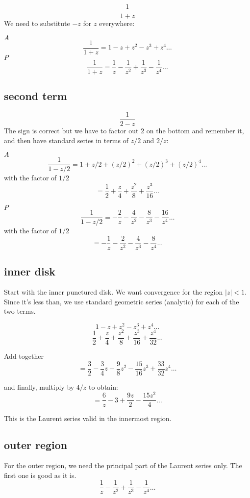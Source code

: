 \documentclass[11pt, oneside]{article}
\begin{document}
\[ \frac{1}{1 + z} \]
We need to substitute $-z$ for $z$ everywhere:

$A$
\[ \frac{1}{1 + z} = 1 - z + z^2 - z^3 + z^4 \dots \]
$P$ 
\[ \frac{1}{1 + z} = \frac{1}{z} - \frac{1}{z^2} + \frac{1}{z^3}  - \frac{1}{z^4} \dots \]

\subsection*{second term}

\[ \frac{1}{2 - z} \]
The sign is correct but we have to factor out $2$ on the bottom and remember it, and then have standard series in terms of $z/2$ and $2/z$:

$A$
\[ \frac{1}{1-z/2} = 1 + z/2 + (z/2)^2 + (z/2)^3 + (z/2)^4 \dots \]
with the factor of $1/2$
\[ = \frac{1}{2} + \frac{z}{4} + \frac{z^2}{8} + \frac{z^3}{16} \dots \]

$P$
\[ \frac{1}{1 - z/2} = - \frac{2}{z} - \frac{4}{z^2} - \frac{8}{z^3}  - \frac{16}{z^4} \dots \]
with the factor of $1/2$
\[ = - \frac{1}{z} - \frac{2}{z^2} - \frac{4}{z^3}  - \frac{8}{z^4} \dots \]

\subsection*{inner disk}

Start with the inner punctured disk.  We want convergence for the region $|z| < 1$.  Since it's less than, we use standard geometric series (analytic) for each of the two terms.

\[  1 - z + z^2 - z^3 + z^4 \dots \]
\[ \frac{1}{2} + \frac{z}{4} + \frac{z^2}{8} + \frac{z^3}{16} + \frac{z^4}{32} \dots \]

Add together
\[ = \frac{3}{2} - \frac{3}{4}z + \frac{9}{8}z^2  - \frac{15}{16}z^3 + \frac{33}{32}z^4 \dots \]

and finally, multiply by $4/z$ to obtain:
\[ = \frac{6}{z} - 3 + \frac{9z}{2} - \frac{15z^2}{4} \dots \]

This is the Laurent series valid in the innermost region.

\subsection*{outer region}

For the outer region, we need the principal part of the Laurent series only.  The first one is good as it is.
\[ \frac{1}{z} - \frac{1}{z^2} + \frac{1}{z^3}  - \frac{1}{z^4} \dots \]
\end{document}
